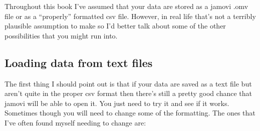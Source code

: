 \documentclass[
  a4paper,
]{book}
\begin{document}
Throughout this book I've assumed that your data are stored as a jamovi
.omv file or as a ``properly'' formatted csv file. However, in real life
that's not a terribly plausible assumption to make so I'd better talk
about some of the other possibilities that you might run into.

\hypertarget{loading-data-from-text-files}{%
\subsection{Loading data from text
files}\label{loading-data-from-text-files}}

The first thing I should point out is that if your data are saved as a
text file but aren't quite in the proper csv format then there's still a
pretty good chance that jamovi will be able to open it. You just need to
try it and see if it works. Sometimes though you will need to change
some of the formatting. The ones that I've often found myself needing to
change are:
\end{document}

